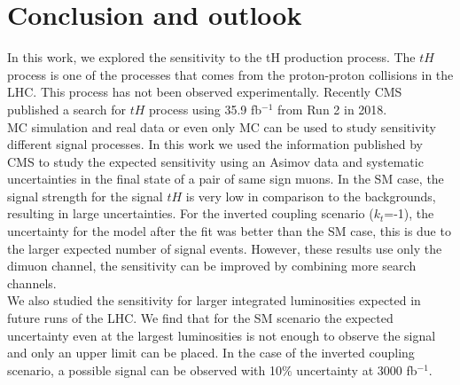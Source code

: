 

\chapter{Conclusion and outlook}
In this work, we explored the sensitivity to the tH production process.
The $tH$ process is one of the processes that comes from the proton-proton collisions in the LHC. This process has not been observed experimentally. Recently CMS published a search for $tH$ process using 35.9 fb$^{-1}$ from Run 2 in 2018. \\

MC simulation and real data or even only MC can be used to study sensitivity different signal processes. In this work we used the information published by CMS to study the expected sensitivity using an Asimov data and systematic uncertainties in the final state of a pair of same sign muons. 
In the SM case, the signal strength for the signal $tH$ is very low in comparison to
the backgrounds, resulting in large uncertainties.
For the inverted coupling scenario ($k_t$=-1), the uncertainty for the model after the fit was better than the
SM case, this is due to the larger expected number of signal events. However, these results use only the dimuon channel, the sensitivity can be improved by combining more search channels.
\\

We also studied the sensitivity for larger integrated luminosities expected in future runs of the LHC. We find that for the SM scenario the expected uncertainty even at the largest luminosities is not enough to observe the signal and only an upper limit can be placed. In the case of the inverted coupling scenario, a possible signal can be observed with 10$\%$ uncertainty at 3000 fb$^{-1}$.\\





